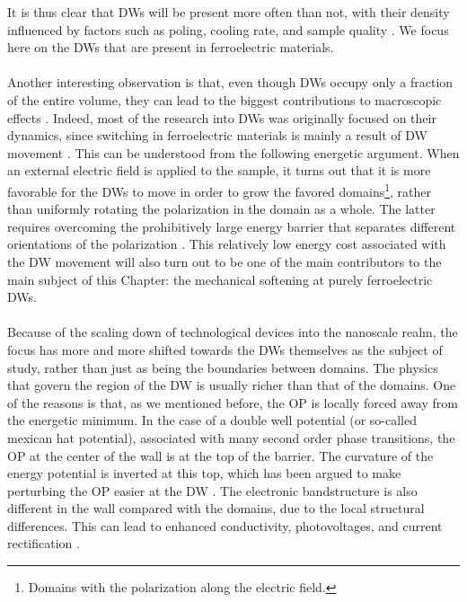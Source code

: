 It is thus clear that DWs will be present more often than not, with their density influenced by factors such as poling, cooling rate, and sample quality \cite{Griffin2012,Shen2018,Nataf2020}.
We focus here on the DWs that are present in ferroelectric materials.
\\\\
Another interesting observation is that, even though DWs occupy only a fraction of the entire volume, they can lead to the biggest contributions to macroscopic effects \cite{Schranz2012}. 
Indeed, most of the research into DWs was originally focused on their dynamics, since switching in ferroelectric materials is mainly a result of DW movement \cite{Merz1954,Gao2013}.
This can be understood from the following energetic argument.
When an external electric field is applied to the sample, it turns out that it is more favorable for the DWs to move in order to grow the favored domains\footnote{Domains with the polarization along the electric field.}, rather than uniformly rotating the polarization in the domain as a whole.
The latter requires overcoming the prohibitively large energy barrier that separates different orientations of the polarization \cite{Tagantsev2010}.
This relatively low energy cost associated with the DW movement will also turn out to be one of the main contributors to the main subject of this Chapter: the mechanical softening at purely ferroelectric DWs.
\\\\
Because of the scaling down of technological devices into the nanoscale realm, the focus has more and more shifted towards the DWs themselves as the subject of study, rather than just as being the boundaries between domains.
The physics that govern the region of the DW is usually richer than that of the domains. One of the reasons is that, as we mentioned before, the OP is locally forced away from the energetic minimum.
In the case of a double well potential (or so-called mexican hat potential), associated with many second order phase transitions, the OP at the center of the wall is at the top of the barrier.
The curvature of the energy potential is inverted at this top, which has been argued to make perturbing the OP easier at the DW \cite{Scott2012}.
The electronic bandstructure is also different in the wall compared with the domains, due to the local structural differences.
This can lead to enhanced conductivity, photovoltages, and current rectification \cite{Korbel2020,Huyan2019}.

